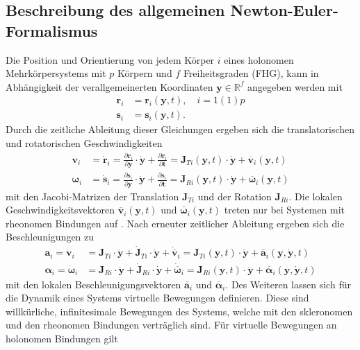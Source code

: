 \subsection{Beschreibung des allgemeinen Newton-Euler-Formalismus}
Die Position und Orientierung von jedem Körper $i$ eines holonomen Mehrkörpersystems mit $p$ Körpern und $f$ Freiheitsgraden (FHG), kann in Abhängigkeit der verallgemeinerten Koordinaten $\pmb{y}\in \mathbb{R}^f$ angegeben werden mit
\begin{align}
\pmb{r}_i &= \pmb{r}_i(\pmb{y},t),\quad i = 1(1)p\\
\pmb{s}_i &= \pmb{s}_i(\pmb{y},t).
\end{align}
Durch die zeitliche Ableitung dieser Gleichungen ergeben sich die translatorischen und rotatorischen Geschwindigkeiten
\begin{align}\label{vi}
\pmb{v}_i &=  \dot{\pmb{r}}_i = \frac{\partial\pmb{r}_i}{\partial\pmb{y}}\cdot \dot{\pmb{y}} + \frac{\partial\pmb{r}_i}{\partial\pmb{t}} = \pmb{J}_{Ti}(\pmb{y},t)\cdot \dot{\pmb{y}} + \overline{\pmb{v}}_i(\pmb{y},t)\\\label{omegai}
\pmb{\omega}_i &=  \dot{\pmb{s}}_i = \frac{\partial\pmb{s}_i}{\partial\pmb{y}}\cdot \dot{\pmb{y}} + \frac{\partial\pmb{s}_i}{\partial\pmb{t}} = \pmb{J}_{Ri}(\pmb{y},t)\cdot \dot{\pmb{y}} + \overline{\pmb{\omega}}_i(\pmb{y},t)
\end{align}
mit den Jacobi-Matrizen der Translation $\pmb{J}_{Ti}$ und der Rotation $\pmb{J}_{Ri}$. Die lokalen Geschwindigkeitsvektoren $\overline{\pmb{v}}_i(\pmb{y},t)$ und $\overline{\pmb{\omega}}_i(\pmb{y},t)$ treten nur bei Systemen mit rheonomen Bindungen auf \cite[S.46]{Schiehlen.2017}. Nach erneuter zeitlicher Ableitung ergeben sich die Beschleunigungen zu
\begin{align}
\pmb{a}_i = \dot{\pmb{v}}_i &= \pmb{J}_{Ti} \cdot \ddot{\pmb{y}} + \dot{\pmb{J}}_{Ti} \cdot \dot{\pmb{y}} + \dot{\overline{\pmb{v}}}_i = \pmb{J}_{Ti}(\pmb{y},t) \cdot \ddot{\pmb{y}} + \overline{\pmb{a}}_i(\pmb{y},\dot{\pmb{y}},t)\\
\pmb{\alpha}_i = \dot{\pmb{\omega}}_i &= \pmb{J}_{Ri} \cdot \ddot{\pmb{y}} + \dot{\pmb{J}}_{Ri} \cdot \dot{\pmb{y}} + \dot{\overline{\pmb{\omega}}}_i = \pmb{J}_{Ri}(\pmb{y},t) \cdot \ddot{\pmb{y}} + \overline{\pmb{\alpha}}_i(\pmb{y},\dot{\pmb{y}},t)\label{alphai}
\end{align}
mit den lokalen Beschleunigungsvektoren $\overline{\pmb{a}}_i$ und $ \overline{\pmb{\alpha}}_i$. 
Des Weiteren lassen sich für die Dynamik eines Systems virtuelle Bewegungen definieren. Diese sind willkürliche, infinitesimale Bewegungen des Systems, welche mit den skleronomen und den rheonomen Bindungen verträglich sind. Für virtuelle Bewegungen an holonomen Bindungen gilt
